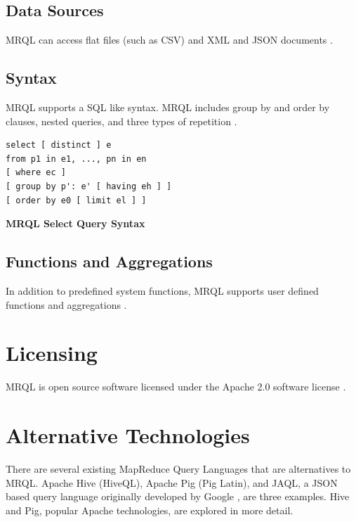 \documentclass[9pt,twocolumn,twoside]{../../styles/osajnl}
\begin{document}
\subsection{Data Sources}

MRQL can access flat files (such as CSV) and XML and JSON documents \cite{www-wikilanguage}.

\subsection{Syntax}

MRQL supports a SQL like syntax.  MRQL includes group by and order by clauses, nested queries, and three types of repetition \cite{www-wikilanguage}.

\vspace{-\topsep}
\begin{verbatim}
select [ distinct ] e
from p1 in e1, ..., pn in en
[ where ec ]
[ group by p': e' [ having eh ] ]
[ order by e0 [ limit el ] ]
\end{verbatim}
\vspace{-\topsep}
\textbf{MRQL Select Query Syntax \cite{www-wikilanguage}}


\subsection{Functions and Aggregations}

In addition to predefined system functions, MRQL supports user defined functions and aggregations \cite{www-wikilanguage}.



\section{Licensing}

MRQL is open source software licensed under the Apache 2.0 software license \cite{www-mrqllicense}.

\section{Alternative Technologies}

There are several existing MapReduce Query Languages that are alternatives to MRQL.  Apache Hive (HiveQL), Apache Pig (Pig Latin), and JAQL, a JSON based query language originally developed by Google \cite{www-wikijaql}, are three examples.  Hive and Pig, popular Apache technologies, are explored in more detail.
\end{document}
